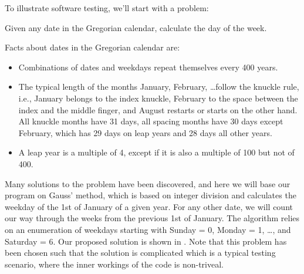 \documentclass[fsharpNotes.tex]{subfiles}
\begin{document}
To illustrate software testing, we'll start with a problem:
\begin{task}{}
Given any date in the Gregorian calendar, calculate the day of the week.
\end{task}
Facts about dates in the Gregorian calendar are:
\begin{itemize}
\item Combinations of dates and weekdays repeat themselves every 400 years.
\item The typical length of the months January, February, \dots follow the knuckle rule, i.e., January belongs to the index knuckle, February to the space between the index and the middle finger, and August restarts or starts on the other hand. All knuckle months have 31 days, all spacing months have 30 days except February, which has 29 days on leap years and 28 days all other years.
\item A leap year is a multiple of 4, except if it is also a multiple of 100 but not of 400.
\end{itemize}
Many solutions to the problem have been discovered, and here we will base our program on Gauss' method, which is based on integer division and calculates the weekday of the 1st of January of a given year. For any other date, we will count our way through the weeks from the previous 1st of January. The algorithm relies on an enumeration of weekdays starting with Sunday = 0, Monday = 1, \dots, and Saturday = 6. Our proposed solution is shown in .
% 
% 
Note that this problem has been chosen such that the solution is complicated which is a typical testing scenario, where the inner workings of the code is non-triveal.
\end{document}
